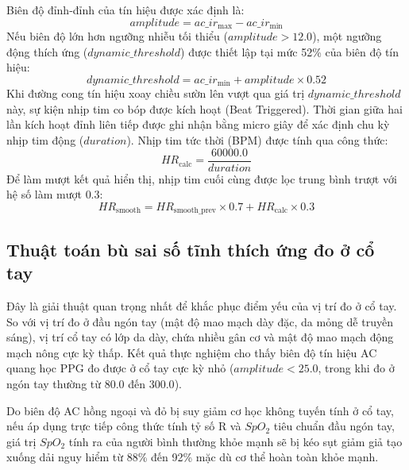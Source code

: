 Biên độ đỉnh-đỉnh của tín hiệu được xác định là:
\begin{equation}
    amplitude = ac\_ir_{\text{max}} - ac\_ir_{\text{min}}
\end{equation}
Nếu biên độ lớn hơn ngưỡng nhiễu tối thiểu ($amplitude > 12.0$), một ngưỡng động thích ứng ($dynamic\_threshold$) được thiết lập tại mức 52\% của biên độ tín hiệu:
\begin{equation}
    dynamic\_threshold = ac\_ir_{\text{min}} + amplitude \times 0.52
\end{equation}
Khi đường cong tín hiệu xoay chiều sườn lên vượt qua giá trị $dynamic\_threshold$ này, sự kiện nhịp tim co bóp được kích hoạt (Beat Triggered). Thời gian giữa hai lần kích hoạt đỉnh liên tiếp được ghi nhận bằng micro giây để xác định chu kỳ nhịp tim động ($duration$). Nhịp tim tức thời (BPM) được tính qua công thức:
\begin{equation}
    HR_{\text{calc}} = \frac{60000.0}{duration}
\end{equation}
Để làm mượt kết quả hiển thị, nhịp tim cuối cùng được lọc trung bình trượt với hệ số làm mượt $0.3$:
\begin{equation}
    HR_{\text{smooth}} = HR_{\text{smooth\_prev}} \times 0.7 + HR_{\text{calc}} \times 0.3
\end{equation}

\subsection{Thuật toán bù sai số tĩnh thích ứng đo ở cổ tay}
Đây là giải thuật quan trọng nhất để khắc phục điểm yếu của vị trí đo ở cổ tay. So với vị trí đo ở đầu ngón tay (mật độ mao mạch dày đặc, da mỏng dễ truyền sáng), vị trí cổ tay có lớp da dày, chứa nhiều gân cơ và mật độ mao mạch động mạch nông cực kỳ thấp. Kết quả thực nghiệm cho thấy biên độ tín hiệu AC quang học PPG đo được ở cổ tay cực kỳ nhỏ ($amplitude < 25.0$, trong khi đo ở ngón tay thường từ $80.0$ đến $300.0$). 

Do biên độ AC hồng ngoại và đỏ bị suy giảm cơ học không tuyến tính ở cổ tay, nếu áp dụng trực tiếp công thức tính tỷ số R và $SpO_2$ tiêu chuẩn đầu ngón tay, giá trị $SpO_2$ tính ra của người bình thường khỏe mạnh sẽ bị kéo sụt giảm giả tạo xuống dải nguy hiểm từ 88\% đến 92\% mặc dù cơ thể hoàn toàn khỏe mạnh.

